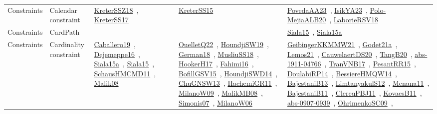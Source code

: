 {\begin{longtable}{lp{3cm}>{\raggedright\arraybackslash}p{6cm}>{\raggedright\arraybackslash}p{6cm}>{\raggedright\arraybackslash}p{8cm}}
Constraints & Calendar constraint & \href{../works/KreterSSZ18.pdf}{KreterSSZ18}~\cite{KreterSSZ18}, \href{../works/KreterSS17.pdf}{KreterSS17}~\cite{KreterSS17} & \href{../works/KreterSS15.pdf}{KreterSS15}~\cite{KreterSS15} & \href{../works/PovedaAA23.pdf}{PovedaAA23}~\cite{PovedaAA23}, \href{../works/IsikYA23.pdf}{IsikYA23}~\cite{IsikYA23}, \href{../works/Polo-MejiaALB20.pdf}{Polo-MejiaALB20}~\cite{Polo-MejiaALB20}, \href{../works/LaborieRSV18.pdf}{LaborieRSV18}~\cite{LaborieRSV18}\\
Constraints & CardPath &  &  & \href{../works/Siala15.pdf}{Siala15}~\cite{Siala15}, \href{../works/Siala15a.pdf}{Siala15a}~\cite{Siala15a}\\
Constraints & Cardinality constraint & \href{../works/Caballero19.pdf}{Caballero19}~\cite{Caballero19}, \href{../works/Dejemeppe16.pdf}{Dejemeppe16}~\cite{Dejemeppe16}, \href{../works/Siala15a.pdf}{Siala15a}~\cite{Siala15a}, \href{../works/Siala15.pdf}{Siala15}~\cite{Siala15}, \href{../works/SchausHMCMD11.pdf}{SchausHMCMD11}~\cite{SchausHMCMD11}, \href{../works/Malik08.pdf}{Malik08}~\cite{Malik08} & \href{../works/OuelletQ22.pdf}{OuelletQ22}~\cite{OuelletQ22}, \href{../works/HoundjiSW19.pdf}{HoundjiSW19}~\cite{HoundjiSW19}, \href{../works/German18.pdf}{German18}~\cite{German18}, \href{../works/MusliuSS18.pdf}{MusliuSS18}~\cite{MusliuSS18}, \href{../works/HookerH17.pdf}{HookerH17}~\cite{HookerH17}, \href{../works/Fahimi16.pdf}{Fahimi16}~\cite{Fahimi16}, \href{../works/BofillGSV15.pdf}{BofillGSV15}~\cite{BofillGSV15}, \href{../works/HoundjiSWD14.pdf}{HoundjiSWD14}~\cite{HoundjiSWD14}, \href{../works/ChuGNSW13.pdf}{ChuGNSW13}~\cite{ChuGNSW13}, \href{../works/HachemiGR11.pdf}{HachemiGR11}~\cite{HachemiGR11}, \href{../works/MilanoW09.pdf}{MilanoW09}~\cite{MilanoW09}, \href{../works/MalikMB08.pdf}{MalikMB08}~\cite{MalikMB08}, \href{../works/Simonis07.pdf}{Simonis07}~\cite{Simonis07}, \href{../works/MilanoW06.pdf}{MilanoW06}~\cite{MilanoW06} & \href{../works/GeibingerKKMMW21.pdf}{GeibingerKKMMW21}~\cite{GeibingerKKMMW21}, \href{../works/Godet21a.pdf}{Godet21a}~\cite{Godet21a}, \href{../works/Lemos21.pdf}{Lemos21}~\cite{Lemos21}, \href{../works/CauwelaertDS20.pdf}{CauwelaertDS20}~\cite{CauwelaertDS20}, \href{../works/TangB20.pdf}{TangB20}~\cite{TangB20}, \href{../works/abs-1911-04766.pdf}{abs-1911-04766}~\cite{abs-1911-04766}, \href{../works/TranVNB17.pdf}{TranVNB17}~\cite{TranVNB17}, \href{../works/PesantRR15.pdf}{PesantRR15}~\cite{PesantRR15}, \href{../works/DoulabiRP14.pdf}{DoulabiRP14}~\cite{DoulabiRP14}, \href{../works/BessiereHMQW14.pdf}{BessiereHMQW14}~\cite{BessiereHMQW14}, \href{../works/BajestaniB13.pdf}{BajestaniB13}~\cite{BajestaniB13}, \href{../works/LimtanyakulS12.pdf}{LimtanyakulS12}~\cite{LimtanyakulS12}, \href{../works/Menana11.pdf}{Menana11}~\cite{Menana11}, \href{../works/BajestaniB11.pdf}{BajestaniB11}~\cite{BajestaniB11}, \href{../works/ClercqPBJ11.pdf}{ClercqPBJ11}~\cite{ClercqPBJ11}, \href{../works/KovacsB11.pdf}{KovacsB11}~\cite{KovacsB11}, \href{../works/abs-0907-0939.pdf}{abs-0907-0939}~\cite{abs-0907-0939}, \href{../works/OhrimenkoSC09.pdf}{OhrimenkoSC09}~\cite{OhrimenkoSC09}, 
\end{longtable}}
